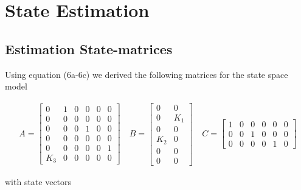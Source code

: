 \section{State Estimation}
\subsection{Estimation State-matrices}

Using equation (6a-6c) we derived the following matrices for the state space model



\begin{align}
    A = \begin{bmatrix}0&1&0&0&0&0\\0&0&0&0&0&0\\0&0&0&1&0&0\\0&0&0&0&0&0\\0&0&0&0&0&1\\ K_3&0&0&0&0&0 \end{bmatrix} 
    \quad   
    B = \begin{bmatrix} 0&0\\0&K_1\\0&0\\K_2&0\\0&0\\0&0 \end{bmatrix} 
    \quad 
    C = \begin{bmatrix} 1&0&0&0&0&0 \\ 0&0&1&0&0&0 \\ 0&0&0&0&1&0 \end{bmatrix}
\end{align}

with state vectors


